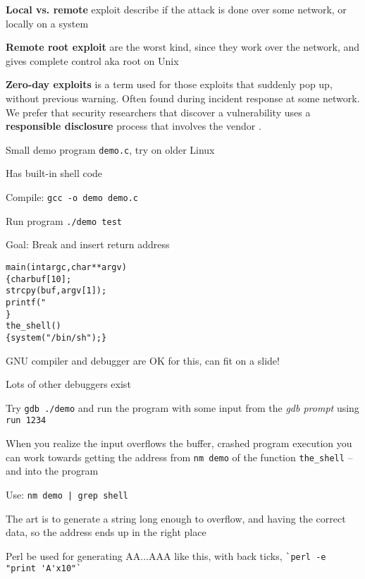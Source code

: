 \documentclass[Screen16to9,17pt]{foils}
\begin{document}
\begin{list1}
\item {\bfseries Local vs. remote} exploit describe if the attack is done over some network, or locally on a system
\item {\bfseries Remote root exploit}
are the worst kind, since they work over the network, and gives complete control aka root on Unix
\item {\bfseries Zero-day exploits} is a term used for those exploits that suddenly pop up, without previous warning. Often found during incident response at some network. We prefer that security researchers that discover a vulnerability uses a {\bf responsible disclosure} process that involves the vendor .
\end{list1}






\begin{list2}
\item Small demo program \verb+demo.c+, try on older Linux
\item Has built-in shell code
\item Compile:
\verb+gcc -o demo demo.c+
\item Run program
\verb+./demo test+
\item Goal: Break and insert return address
\end{list2}

\begin{alltt}\small
main(int argc, char **argv)
\{      char buf[10];
        strcpy(buf, argv[1]);
        printf("%s\textbackslash{}n",buf);
\}
the_shell()
\{  system("/bin/sh");  \}
\end{alltt}



\begin{list1}
\item GNU compiler and debugger are OK for this, can fit on a slide!
\item Lots of other debuggers exist
\item Try \verb+gdb ./demo+ and run the program with some input from the \emph{gdb prompt}
using \verb+run 1234+
\item When you realize the input overflows the buffer, crashed program execution you can work towards getting the address from \verb+nm demo+ of the function \verb+the_shell+
   -- and into the program
\item Use: \verb+nm demo | grep shell+
\item The art is to generate a string long enough to overflow, and having the correct data, so the address ends up in the right place
\item Perl be used for generating AA...AAA like this, with back ticks, \verb+`perl -e "print 'A'x10"`+
\end{list1}
\end{document}
